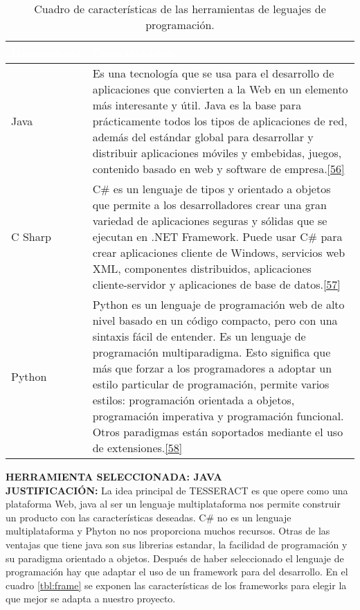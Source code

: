 \begin{table}[H]
	\centering
	\begin{tabular}{|p{3cm}|p{12cm}|}
		\hline
		\rowcolor{black}  \textcolor{white}{\textbf{Herramienta}} & \textcolor{white}{\textbf{Características}}  \\ \hline
		Java &  Es una tecnología que se usa para el desarrollo de aplicaciones que convierten a la Web en un elemento más interesante y útil. Java es la base para prácticamente todos los tipos de aplicaciones de red, además del estándar global para desarrollar y distribuir aplicaciones móviles y embebidas, juegos, contenido basado en web y software de empresa.\hyperlink{b56}{[56]} \\
		\hline
		C Sharp & C\# es un lenguaje de tipos y orientado a objetos que permite a los desarrolladores crear una gran variedad de aplicaciones seguras y sólidas que se ejecutan en .NET Framework. Puede usar C\# para crear aplicaciones cliente de Windows, servicios web XML, componentes distribuidos, aplicaciones cliente-servidor y aplicaciones de base de datos.\hyperlink{b57}{[57]} \\
		\hline
		Python & Python es un lenguaje de programación web de alto nivel basado en un código compacto, pero con una sintaxis fácil de entender. Es un lenguaje de programación multiparadigma. Esto significa que más que forzar a los programadores a adoptar un estilo particular de programación, permite varios estilos: programación orientada a objetos, programación imperativa y programación funcional. Otros paradigmas están soportados mediante el uso de extensiones.\hyperlink{b58}{[58]} \\
		\hline

	\end{tabular}
\caption{Cuadro de características de las herramientas de leguajes de programación.}
\label{tbl:lenguaje}
\end{table}

\textbf {HERRAMIENTA SELECCIONADA: JAVA}\\

\textbf {JUSTIFICACIÓN:} La idea principal de TESSERACT es que opere como una plataforma Web, java al ser un lenguaje multiplataforma nos permite construir un producto con las características deseadas. C\# no es un lenguaje multiplataforma y Phyton no nos proporciona muchos recursos. Otras de las ventajas que tiene java son sus librerias estandar, la facilidad de programación y su paradigma orientado a objetos. 
\newpage
Después de haber seleccionado el lenguaje de programación hay que adaptar el uso de un framework para del desarrollo. En el cuadro \ref{tbl:frame} se exponen las características de los frameworks para elegir la que mejor se adapta a nuestro proyecto.

